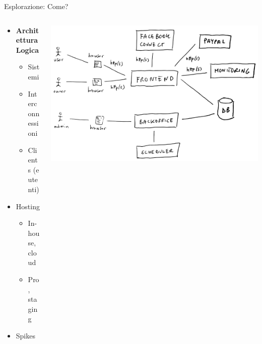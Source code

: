 \documentclass[compress, red, 14pt, pdf]{beamer}
\begin{document}
	\begin{frame}{Esplorazione: Come?}
		
		\begin{columns}[T]
		    \begin{column}{.5\textwidth}

		\begin{itemize}
			\item \textbf{Architettura Logica}
			\begin{itemize}
				\item Sistemi
				\item Interconnessioni
				\item Clients (e utenti)
			\end{itemize}
		\end{itemize}		
		
		\begin{itemize}
			\item Hosting
			\begin{itemize}
				\item In-house, cloud
				\item Pro, staging
			\end{itemize}
			\item Spikes
		\end{itemize}
		
	    \end{column}
	    \begin{column}{.5\textwidth}
			\hspace*{-0.6cm}
		    \includegraphics[scale=0.17]{images/architecture.png}
	    \end{column}
	 \end{columns}

	\end{frame}
\end{document}
